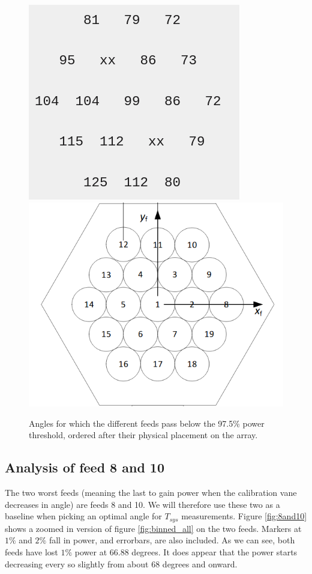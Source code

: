 \documentclass[10pt, a4paper]{article}
\begin{document}
\vspace{1cm}
\begin{figure}[H]
    \centering
    \includegraphics[scale=0.5]{../plots/vane_nums1.png}
    \includegraphics[scale=0.4]{../plots/vane_nums2.png}
    \caption{Angles for which the different feeds pass below the 97.5\% power threshold, ordered after their physical placement on the array.}
    \label{fig:layout}
\end{figure}



\subsection{Analysis of feed 8 and 10}
The two worst feeds (meaning the last to gain power when the calibration vane decreases in angle) are feeds 8 and 10. We will therefore use these two as a baseline when picking an optimal angle for $T_{sys}$ measurements. Figure \ref{fig:8and10} shows a zoomed in version of figure \ref{fig:binned_all} on the two feeds. Markers at $1\%$ and $2\%$ fall in power, and errorbars, are also included. As we can see, both feeds have lost $1\%$ power at $66.88$ degrees. It does appear that the power starts decreasing every so slightly from about $68$ degrees and onward.
\end{document}
